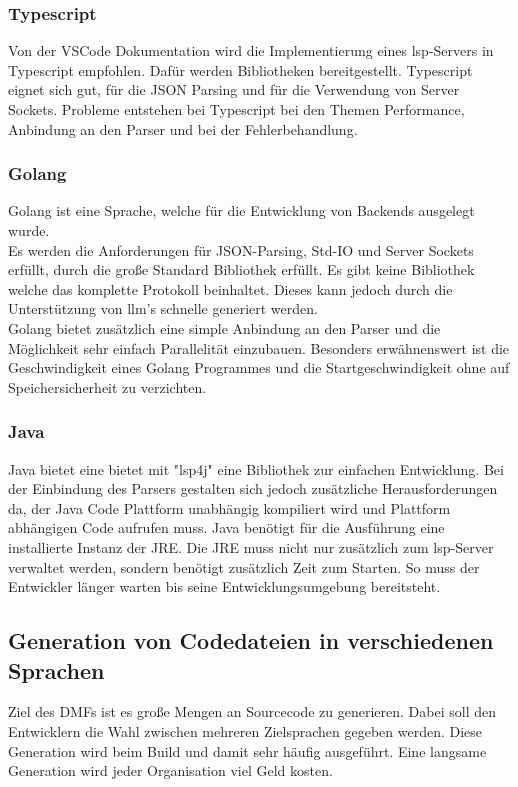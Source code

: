 \documentclass[./einleitung.tex]{subfiles}
\begin{document}
\subsubsection{Typescript}
Von der VSCode Dokumentation wird die Implementierung eines \acrlong{lsp}-Servers in Typescript empfohlen.
Dafür werden Bibliotheken bereitgestellt.
Typescript eignet sich gut, für die JSON Parsing und für die Verwendung von Server Sockets.
Probleme entstehen bei Typescript bei den Themen Performance, Anbindung an den Parser und bei der Fehlerbehandlung.

\subsubsection{Golang}
Golang ist eine Sprache, welche für die Entwicklung von Backends ausgelegt wurde. \\
Es werden die Anforderungen für JSON-Parsing, Std-IO und Server Sockets erfüllt, durch die große Standard Bibliothek erfüllt.
Es gibt keine Bibliothek welche das komplette Protokoll beinhaltet.
Dieses kann jedoch durch die Unterstützung von \acrshort{llm}'s schnelle generiert werden.\\
Golang bietet zusätzlich eine simple Anbindung an den Parser und die Möglichkeit sehr einfach Parallelität einzubauen.
Besonders erwähnenswert ist die Geschwindigkeit eines Golang Programmes und die Startgeschwindigkeit ohne auf Speichersicherheit zu verzichten.

\subsubsection{Java}
Java bietet eine bietet mit "lsp4j" eine Bibliothek zur einfachen Entwicklung.
Bei der Einbindung des Parsers gestalten sich jedoch zusätzliche Herausforderungen da, der Java Code Plattform unabhängig kompiliert wird und Plattform abhängigen Code aufrufen muss.
Java benötigt für die Ausführung eine installierte Instanz der JRE. Die JRE muss nicht nur zusätzlich zum \acrlong{lsp}-Server verwaltet werden, sondern benötigt zusätzlich Zeit zum Starten.
So muss der Entwickler länger warten bis seine Entwicklungsumgebung bereitsteht.


\subsection{Generation von Codedateien in verschiedenen Sprachen}
Ziel des DMFs ist es große Mengen an Sourcecode zu generieren.
Dabei soll den Entwicklern die Wahl zwischen mehreren Zielsprachen gegeben werden.
Diese Generation wird beim Build und damit sehr häufig ausgeführt.
Eine langsame Generation wird jeder Organisation viel Geld kosten.
\end{document}
